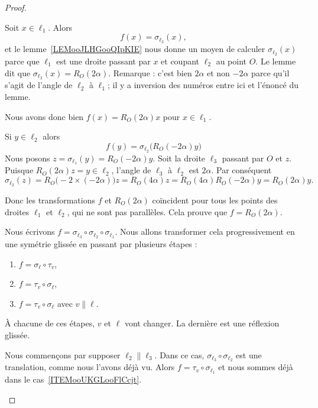 \begin{proof}
\begin{subproof}
		Soit \( x\in \ell_1\). Alors
		\begin{equation}
			f(x)=\sigma_{\ell_2}(x),
		\end{equation}
		et le lemme~\ref{LEMooJLHGooQIpKIE} nous donne un moyen de calculer \( \sigma_{\ell_2}(x)\) parce que \( \ell_1\) est une droite passant par \( x\) et coupant \( \ell_2\) au point \( O\). Le lemme dit que \( \sigma_{\ell_2}(x)=R_O(2\alpha)\). Remarque : c'est bien \( 2\alpha\) et non \( -2\alpha\) parce qu'il s'agit de l'angle de \( \ell_2\) à \( \ell_1\); il y a inversion des numéros entre ici et l'énoncé du lemme.

		Nous avons donc bien \( f(x)=R_O(2\alpha)x\) pour \( x\in \ell_1\).

		Si \( y\in\ell_2\) alors
		\begin{equation}
			f(y)=\sigma_{\ell_2}\big( R_O(-2\alpha)y \big)
		\end{equation}
		Nous posons \( z=\sigma_{\ell_1}(y)=R_O(-2\alpha)y\). Soit la droite \( \ell_3\) passant par \( O\) et \( z\). Puisque \( R_O(2\alpha)z=y\in \ell_2\), l'angle de \( \ell_3\) à \( \ell_2\) est \( 2\alpha\). Par conséquent
		\begin{equation}
			\sigma_{\ell_2}(z)=R_O\big( -2\times (-2\alpha) \big)z=R_O(4\alpha)z=R_O(4\alpha)R_O(-2\alpha)y=R_O(2\alpha)y.
		\end{equation}

		Donc les transformations \( f\) et \( R_O(2\alpha)\) coïncident pour tous les points des droites \( \ell_1\) et \( \ell_2\), qui ne sont pas parallèles. Cela prouve que \( f=R_{O}(2\alpha)\).

		Nous écrivons \( f=\sigma_{\ell_3}\circ\sigma_{\ell_2}\circ\sigma_{\ell_1}\). Nous allons transformer cela progressivement en une symétrie glissée en passant par plusieurs étapes :
		\begin{enumerate}
			\item       \label{ITEMooHVYCooPhFMiv}
			      \( f=\sigma_{\ell}\circ\tau_v\),
			\item       \label{ITEMooUKGLooFlCcjt}
			      \( f=\tau_v\circ\sigma_{\ell}\),
			\item       \label{ITEMooWUCWooZSjofe}
			      \( f=\tau_v\circ\sigma_{\ell} \) avec \( v\parallel\ell\).
		\end{enumerate}
		À chacune de ces étapes, \( v\) et \( \ell\) vont changer. La dernière est une réflexion glissée.

		Nous commençons par supposer \( \ell_2\parallel\ell_3\). Dans ce cas, \( \sigma_{\ell_3}\circ\sigma_{\ell_2}\) est une translation, comme nous l'avons déjà vu. Alors \( f= \tau_v\circ\sigma_{\ell_1}\) et nous sommes déjà dans le cas~\ref{ITEMooUKGLooFlCcjt}.


\end{subproof}
\end{proof}
